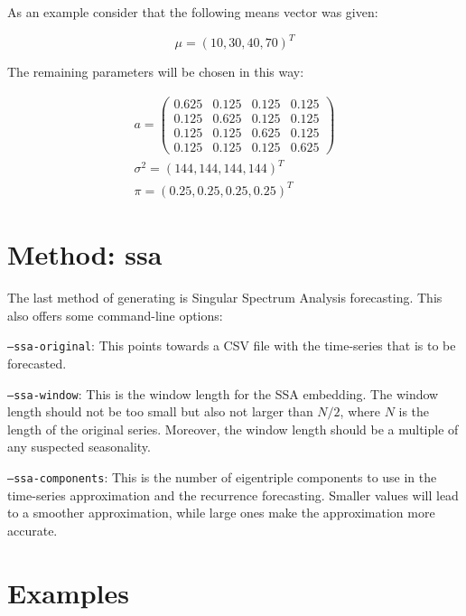 As an example consider that the following means vector was given: 

\begin{equation}
    \mu = (10, 30, 40, 70)^T
\end{equation}

The remaining parameters will be chosen in this way:

\begin{equation}
    \begin{split}
    a = 
    \begin{pmatrix}
        0.625 & 0.125 & 0.125 & 0.125 \\
        0.125 & 0.625 & 0.125 & 0.125 \\
        0.125 & 0.125 & 0.625 & 0.125 \\
        0.125 & 0.125 & 0.125 & 0.625
    \end{pmatrix} \\
    \sigma^2 = (144, 144, 144, 144)^T \\
    \pi = (0.25, 0.25, 0.25, 0.25)^T 
\end{split}
\end{equation}

\section{Method: ssa}

The last method of generating is Singular Spectrum Analysis forecasting. This also offers some command-line options: 

\texttt{---ssa-original}: This points towards a CSV file with the time-series that is to be forecasted. 

\texttt{---ssa-window}: This is the window length for the SSA embedding. The window length should not be too small but also not larger than $N/2$, where $N$ is the length of the original series. Moreover, the window length should be a multiple of any suspected seasonality.

\texttt{---ssa-components}: This is the number of eigentriple components to use in the time-series approximation and the recurrence forecasting. Smaller values will lead to a smoother approximation, while large ones make the approximation more accurate. 

\section{Examples}

